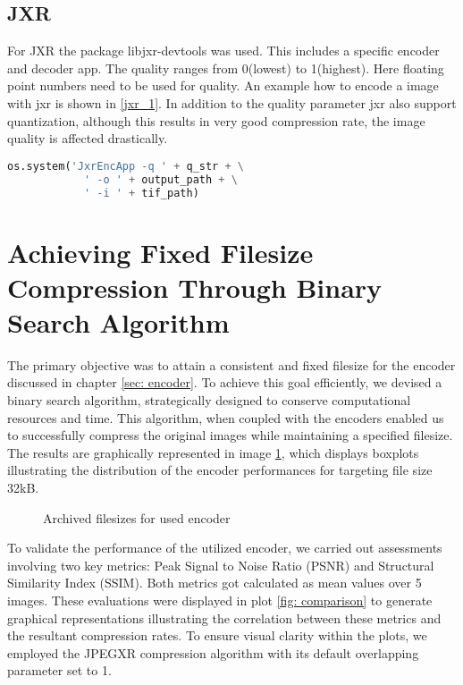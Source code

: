\subsection{JXR}
For JXR the package libjxr-devtools was used. This includes a specific encoder and decoder app. The quality ranges from 0(lowest) to 1(highest). Here floating point numbers need to be used for quality.
An example how to encode a image with jxr is shown in \ref{jxr_1}. In addition to the quality parameter jxr also support quantization, although this results in very good compression rate, the image quality is affected drastically.
\begin{lstlisting}[label={jxr_1}, language=Python, caption=Encode BPG]
os.system('JxrEncApp -q ' + q_str + \
            ' -o ' + output_path + \
            ' -i ' + tif_path)
\end{lstlisting}

\newpage
\section{Achieving Fixed Filesize Compression Through Binary Search Algorithm}
\label{sec: filesize}

The primary objective was to attain a consistent and fixed filesize for the encoder discussed in chapter \ref{sec: encoder}. To achieve this goal efficiently, we devised a binary search algorithm, strategically designed to conserve computational resources and time. This algorithm, when coupled with the encoders enabled us to successfully compress the original images while maintaining a specified filesize. The results are graphically represented in image \ref{fig: fsize_comparison}, which displays boxplots illustrating the distribution of the encoder performances for targeting file size 32kB.

\begin{figure}[h!]
	\centering
	\resizebox{\textwidth}{!}{}
	\caption{Archived filesizes for used encoder}
	\label{fig: fsize_comparison}
\end{figure}

\noindent
To validate the performance of the utilized encoder, we carried out assessments involving two key metrics: Peak Signal to Noise Ratio (PSNR) and Structural Similarity Index (SSIM). Both metrics got calculated as mean values over 5 images. These evaluations were displayed in plot \ref{fig: comparison} to generate graphical representations illustrating the correlation between these metrics and the resultant compression rates. To ensure visual clarity within the plots, we employed the JPEGXR compression algorithm with its default overlapping parameter set to 1.

